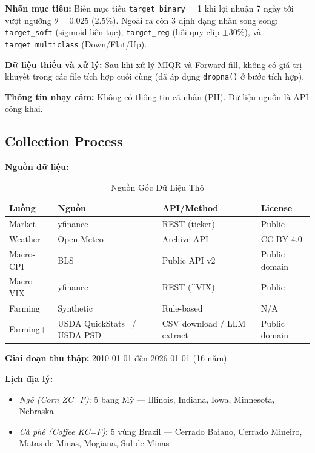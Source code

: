 \textbf{Nhãn mục tiêu:}
Biến mục tiêu \texttt{target\_binary} = 1 khi lợi nhuận 7 ngày tới vượt ngưỡng
$\theta = 0.025$ (2.5\%). Ngoài ra còn 3 định dạng nhãn song song:
\texttt{target\_soft} (sigmoid liên tục), \texttt{target\_reg} (hồi quy clip $\pm$30\%),
và \texttt{target\_multiclass} (Down/Flat/Up).

\textbf{Dữ liệu thiếu và xử lý:}
Sau khi xử lý MIQR và Forward-fill, không có giá trị khuyết trong các file tích hợp
cuối cùng (đã áp dụng \texttt{dropna()} ở bước tích hợp).

\textbf{Thông tin nhạy cảm:}
Không có thông tin cá nhân (PII). Dữ liệu nguồn là API công khai.

\subsection{Collection Process}

\textbf{Nguồn dữ liệu:}

\begin{table}[htbp]
\caption{Nguồn Gốc Dữ Liệu Thô}
\label{tab:data_sources}
\centering
\begin{tabular}{@{}llll@{}}
\toprule
\textbf{Luồng} & \textbf{Nguồn} & \textbf{API/Method} & \textbf{License} \\
\midrule
Market & yfinance & REST (ticker) & Public \\
Weather & Open-Meteo~\cite{zippenfenig2023openmeteo} & Archive API & CC BY 4.0 \\
Macro-CPI & BLS~\cite{bls2026cpi} & Public API v2 & Public domain \\
Macro-VIX & yfinance & REST (\^{}VIX) & Public \\
Farming  & Synthetic & Rule-based & N/A \\
Farming+ & USDA QuickStats~\cite{usda2026quickstats} / USDA PSD~\cite{usda2026psd} & CSV download / LLM extract & Public domain \\
\bottomrule
\end{tabular}
\end{table}

\textbf{Giai đoạn thu thập:} 2010-01-01 đến 2026-01-01 (16 năm).

\textbf{Lịch địa lý:}
\begin{itemize}
\item \textit{Ngô (Corn ZC=F)}: 5 bang Mỹ — Illinois, Indiana, Iowa, Minnesota, Nebraska
\item \textit{Cà phê (Coffee KC=F)}: 5 vùng Brazil — Cerrado Baiano, Cerrado Mineiro,
      Matas de Minas, Mogiana, Sul de Minas
\end{itemize}

